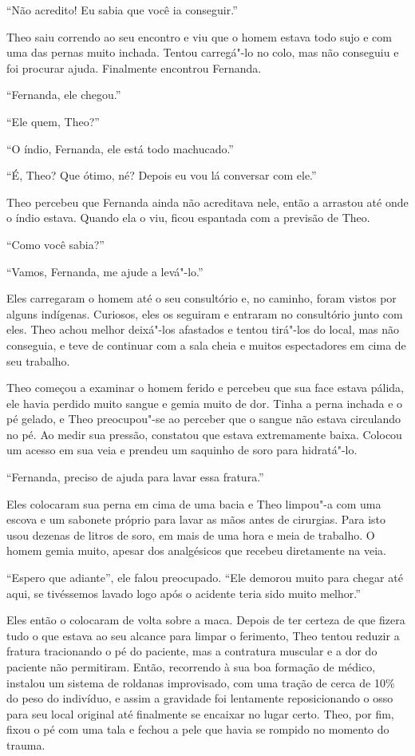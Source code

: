 ``Não acredito! Eu sabia que você ia conseguir.''

Theo saiu correndo ao seu encontro e viu que o homem estava todo sujo e
com uma das pernas muito inchada. Tentou carregá"-lo no colo, mas não
conseguiu e foi procurar ajuda. Finalmente encontrou Fernanda.

``Fernanda, ele chegou.''

``Ele quem, Theo?''

``O índio, Fernanda, ele está todo machucado.''

``É, Theo? Que ótimo, né? Depois eu vou lá conversar com ele.''

Theo percebeu que Fernanda ainda não acreditava nele, então a arrastou
até onde o índio estava. Quando ela o viu, ficou espantada com a
previsão de Theo.

``Como você sabia?''

``Vamos, Fernanda, me ajude a levá"-lo.''

Eles carregaram o homem até o seu consultório e, no caminho, foram
vistos por alguns indígenas. Curiosos, eles os seguiram e entraram no
consultório junto com eles. Theo achou melhor deixá"-los afastados e
tentou tirá"-los do local, mas não conseguia, e teve de continuar com a
sala cheia e muitos espectadores em cima de seu trabalho.

Theo começou a examinar o homem ferido e percebeu que sua face estava
pálida, ele havia perdido muito sangue e gemia muito de dor. Tinha a perna
inchada e o pé gelado, e Theo preocupou"-se ao perceber que o sangue não estava
circulando no pé. Ao medir sua pressão, constatou que
estava extremamente baixa. Colocou um acesso em sua veia e prendeu um
saquinho de soro para hidratá"-lo.

``Fernanda, preciso de ajuda para lavar essa fratura.''

Eles colocaram sua perna em cima de uma bacia e Theo limpou"-a com uma
escova e um sabonete próprio para lavar as mãos antes de cirurgias. Para
isto usou dezenas de litros de soro, em mais de uma hora e meia de
trabalho. O homem gemia muito, apesar dos analgésicos que recebeu
diretamente na veia.

``Espero que adiante'', ele falou preocupado. ``Ele demorou muito para
chegar até aqui, se tivéssemos lavado logo após o acidente teria sido
muito melhor.''

Eles então o colocaram de volta sobre a maca. Depois de ter certeza de
que fizera tudo o que estava ao seu alcance para limpar o ferimento, Theo
tentou reduzir a fratura tracionando o pé do paciente, mas a contratura
muscular e a dor do paciente não permitiram. Então, recorrendo à sua boa
formação de médico, instalou um sistema de roldanas improvisado,
com uma tração de cerca de 10\% do peso do indivíduo, e assim a gravidade
foi lentamente reposicionando o osso para seu local original até finalmente
se encaixar no lugar certo. Theo, por fim, fixou o pé com uma tala e
fechou a pele que havia se rompido no momento do trauma.

